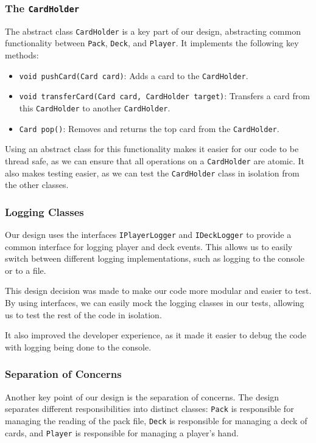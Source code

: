 \documentclass{article}
\begin{document}
\subsubsection{The \texttt{CardHolder}}
The abstract class \texttt{CardHolder} is a key part of our design, abstracting common functionality between \texttt{Pack}, \texttt{Deck}, and \texttt{Player}. It implements the following key methods:
\begin{itemize}
    \item \texttt{void pushCard(Card card)}: Adds a card to the \texttt{CardHolder}.
    \item \texttt{void transferCard(Card card, CardHolder target)}: Transfers a card from this \texttt{CardHolder} to another \texttt{CardHolder}.
    \item \texttt{Card pop()}: Removes and returns the top card from the \texttt{CardHolder}.
\end{itemize}
Using an abstract class for this functionality makes it easier for our code to be thread safe, as we can ensure that all operations on a \texttt{CardHolder} are atomic. It also makes testing easier, as we can test the \texttt{CardHolder} class in isolation from the other classes.

\subsubsection{Logging Classes}
Our design uses the interfaces \texttt{IPlayerLogger} and \texttt{IDeckLogger} to provide a common interface for logging player and deck events. This allows us to easily switch between different logging implementations, such as logging to the console or to a file.

This design decision was made to make our code more modular and easier to test. By using interfaces, we can easily mock the logging classes in our tests, allowing us to test the rest of the code in isolation.

It also improved the developer experience, as it made it easier to debug the code with logging being done to the console.

\subsubsection{Separation of Concerns}
Another key point of our design is the separation of concerns. The design separates different responsibilities into distinct classes: \texttt{Pack} is responsible for managing the reading of the pack file, \texttt{Deck} is responsible for managing a deck of cards, and \texttt{Player} is responsible for managing a player's hand.
\end{document}
